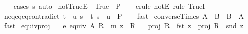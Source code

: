 \begin{isabellebody}
\ \ %
\endisadelimproof
%
\isatagproof
{}\isamarkupfalse%
\ {\isacharparenleft}{\kern0pt}cases\ s{\isacharparenright}{\kern0pt}\ auto%
\endisatagproof
{\isafoldproof}%
%
\isadelimproof
\isanewline
%
\endisadelimproof
\isanewline
{}\isamarkupfalse%
\ not{\isacharunderscore}{\kern0pt}TrueE{\isacharcolon}{\kern0pt}\ {\isachardoublequoteopen}{\isasymnot}\ True\ {\isasymLongrightarrow}\ P{\isachardoublequoteclose}\isanewline
%
\isadelimproof
\ \ %
\endisadelimproof
%
\isatagproof
{}\isamarkupfalse%
\ {\isacharparenleft}{\kern0pt}erule\ notE{\isacharcomma}{\kern0pt}\ rule\ TrueI{\isacharparenright}{\kern0pt}%
\endisatagproof
{\isafoldproof}%
%
\isadelimproof
\isanewline
%
\endisadelimproof
\isanewline
{}\isamarkupfalse%
\ neq{\isacharunderscore}{\kern0pt}eq{\isacharunderscore}{\kern0pt}eq{\isacharunderscore}{\kern0pt}contradict{\isacharcolon}{\kern0pt}\ {\isachardoublequoteopen}{\isasymlbrakk}t\ {\isasymnoteq}\ u{\isacharsemicolon}{\kern0pt}\ s\ {\isacharequal}{\kern0pt}\ t{\isacharsemicolon}{\kern0pt}\ s\ {\isacharequal}{\kern0pt}\ u{\isasymrbrakk}\ {\isasymLongrightarrow}\ P{\isachardoublequoteclose}\isanewline
%
\isadelimproof
\ \ %
\endisadelimproof
%
\isatagproof
{}\isamarkupfalse%
\ fast%
\endisatagproof
{\isafoldproof}%
%
\isadelimproof
\isanewline
%
\endisadelimproof
\isanewline
{}\isamarkupfalse%
\ converse{\isacharunderscore}{\kern0pt}Times{\isacharcolon}{\kern0pt}\ {\isachardoublequoteopen}{\isacharparenleft}{\kern0pt}A\ {\isasymtimes}\ B{\isacharparenright}{\kern0pt}{\isasyminverse}\ {\isacharequal}{\kern0pt}\ B\ {\isasymtimes}\ A{\isachardoublequoteclose}\isanewline
%
\isadelimproof
\ \ %
\endisadelimproof
%
\isatagproof
{}\isamarkupfalse%
\ fast%
\endisatagproof
{\isafoldproof}%
%
\isadelimproof
\isanewline
%
\endisadelimproof
\isanewline
{}\isamarkupfalse%
\ equiv{\isacharunderscore}{\kern0pt}proj{\isacharcolon}{\kern0pt}\isanewline
\ \ \ e{\isacharcolon}{\kern0pt}\ {\isachardoublequoteopen}equiv\ A\ R{\isachardoublequoteclose}\ \ m{\isacharcolon}{\kern0pt}\ {\isachardoublequoteopen}z\ {\isasymin}\ R{\isachardoublequoteclose}\isanewline
\ \ \ {\isachardoublequoteopen}{\isacharparenleft}{\kern0pt}proj\ R\ {\isasymcirc}\ fst{\isacharparenright}{\kern0pt}\ z\ {\isacharequal}{\kern0pt}\ {\isacharparenleft}{\kern0pt}proj\ R\ {\isasymcirc}\ snd{\isacharparenright}{\kern0pt}\ z{\isachardoublequoteclose}\isanewline
%
\isadelimproof
%
\endisadelimproof
%
\isatagproof
{}\isamarkupfalse%

\end{isabellebody}
